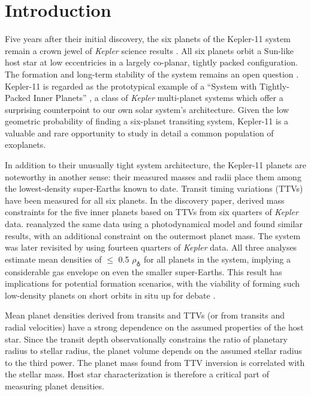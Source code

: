 \documentclass[oneside]{emulateapj}
\begin{document}
\section{Introduction}

Five years after their initial discovery, the six planets of the Kepler-11 system remain a crown jewel of \textit{Kepler} science results \citep{Lissauer2011}. All six planets orbit a Sun-like host star at low eccentricies in a largely co-planar, tightly packed configuration. The formation and long-term stability of the system remains an open question \citep[see e.g.][]{Ikoma2012, Hands2014, Mahajan2014}. Kepler-11 is regarded as the prototypical example of a ``System with Tightly-Packed Inner Planets'' \citep[STIP,][]{Boley2014}, a class of \textit{Kepler} multi-planet systems which offer a surprising counterpoint to our own solar system's architecture. Given the low geometric probability of finding a six-planet transiting system, Kepler-11 is a valuable and rare opportunity to study in detail a common population of exoplanets.

In addition to their unusually tight system architecture, the Kepler-11 planets are noteworthy in another sense: their measured masses and radii place them among the lowest-density super-Earths known to date. Transit timing variations (TTVs) have been measured for all six planets. In the discovery paper, \citet{Lissauer2011} derived mass constraints for the five inner planets based on TTVs from six quarters of \textit{Kepler} data. \citet{Migaszewski2012} reanalyzed the same data using a photodynamical model and found similar results, with an additional constraint on the outermost planet mass. The system was later revisited by \citet{Lissauer2013} using fourteen quarters of \textit{Kepler} data. All three analyses estimate mean densities of $\leq$ 0.5 $\rho_{\earth}$ for all planets in the system, implying a considerable gas envelope on even the smaller super-Earths. This result has implications for potential formation scenarios, with the viability of forming such low-density planets on short orbits in situ up for debate \citep[e.g.][]{Lopez2012, Bodenheimer2014, Howe2015}.

Mean planet densities derived from transits and TTVs (or from transits and radial velocities) have a strong dependence on the assumed properties of the host star. Since the transit depth observationally constrains the ratio of planetary radius to stellar radius, the planet volume depends on the assumed stellar radius to the third power. The planet mass found from TTV inversion is correlated with the stellar mass. Host star characterization is therefore a critical part of measuring planet densities.
\end{document}
